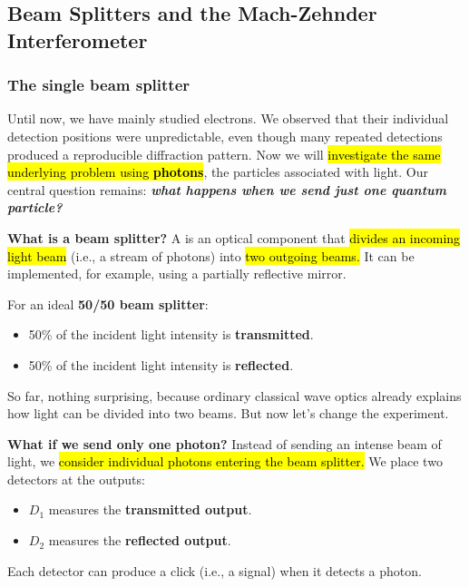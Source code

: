\subsection{Beam Splitters and the Mach-Zehnder Interferometer}\label{sec:from-wave-particle-duality-to-quantum-states:beam-splitters-and-the-mach-zehnder-interferometer}

\subsubsection{The single beam splitter}\label{sec:from-wave-particle-duality-to-quantum-states:beam-splitters-and-the-mach-zehnder-interferometer:single-beam-splitter}

Until now, we have mainly studied electrons. We observed that their individual detection positions were unpredictable, even though many repeated detections produced a reproducible diffraction pattern. Now we will \hl{investigate the same underlying problem using \textbf{photons}}, the particles associated with light. Our central question remains: \textbf{\emph{what happens when we send just one quantum particle?}}

\highspace
\textcolor{Green3}{ \textbf{What is a beam splitter?}} A  is an optical component that \hl{divides an incoming light beam} (i.e., a stream of photons) into \hl{two outgoing beams.} It can be implemented, for example, using a partially reflective mirror.

\highspace
For an ideal \textbf{50/50 beam splitter}:
\begin{itemize}
    \item 50\% of the incident light intensity is \textbf{transmitted}.
    \item 50\% of the incident light intensity is \textbf{reflected}.
\end{itemize}
So far, nothing surprising, because ordinary classical wave optics already explains how light can be divided into two beams. But now let's change the experiment.

\highspace
\textcolor{Green3}{ \textbf{What if we send only one photon?}} Instead of sending an intense beam of light, we \hl{consider individual photons entering the beam splitter.} We place two detectors at the outputs:
\begin{itemize}
    \item $D_1$ measures the \textbf{transmitted output}.
    \item $D_2$ measures the \textbf{reflected output}.
\end{itemize}
Each detector can produce a click (i.e., a signal) when it detects a photon.

